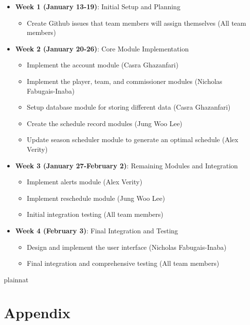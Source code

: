 \documentclass[12pt, titlepage]{article}
\begin{document}
\begin{itemize}
  \item \textbf{Week 1 (January 13-19)}: Initial Setup and Planning
    \begin{itemize}
      \item Create Github issues that team members will assign themselves
      (All team members)
    \end{itemize}
  \item \textbf{Week 2 (January 20-26)}: Core Module Implementation
    \begin{itemize}
      \item Implement the account module (Casra Ghazanfari)
      \item Implement the player, team, and commissioner modules (Nicholas Fabugais-Inaba)
      \item Setup database module for storing different data (Casra Ghazanfari)
      \item Create the schedule record modules (Jung Woo Lee)
      \item Update season scheduler module to generate an optimal schedule (Alex Verity)
    \end{itemize}
  \item \textbf{Week 3 (January 27-February 2)}: Remaining Modules and Integration
    \begin{itemize}
      \item Implement alerts module (Alex Verity)
      \item Implement reschedule module (Jung Woo Lee)
      \item Initial integration testing (All team members)
    \end{itemize}
  \item \textbf{Week 4 (February 3)}: Final Integration and Testing
    \begin{itemize}
      \item Design and implement the user interface (Nicholas Fabugais-Inaba)
      \item Final integration and comprehensive testing (All team members)
    \end{itemize}
\end{itemize}

 {plainnat}


\newpage{}

\section{Appendix} \label{Appendix}
\end{document}
